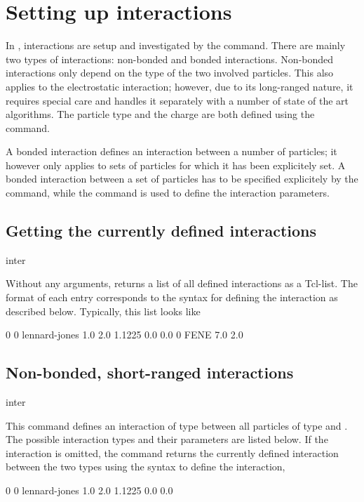 \chapter{Setting up interactions}
\label{sec:inter}

In \es, interactions are setup and investigated by the 
command. There are mainly two types of interactions: non-bonded and
bonded interactions. Non-bonded interactions only depend on the type
of the two involved particles. This also applies to the electrostatic
interaction; however, due to its long-ranged nature, it requires
special care and \es handles it separately with a number of state of
the art algorithms. The particle type and the charge are both defined
using the  command.

A bonded interaction defines an interaction between a number of
particles; it however only applies to sets of particles for which it
has been explicitely set.  A bonded interaction between a set of
particles has to be specified explicitely by the 
command, while the  command is used to define the
interaction parameters.

\section{Getting the currently defined interactions}
\begin{essyntax}
  inter
\end{essyntax}

Without any arguments,  returns a list of all defined
interactions as a Tcl-list. The format of each entry corresponds to
the syntax for defining the interaction as described below. Typically,
this list looks like
\begin{tclcode}
  {0 0 lennard-jones 1.0 2.0 1.1225 0.0 0.0} {0 FENE 7.0 2.0}
\end{tclcode}

\section{Non-bonded, short-ranged interactions}
\label{sec:inter-nb}

\begin{essyntax*}
  inter  
\end{essyntax*}
This command defines an interaction of type  between
all particles of type  and . The possible
interaction types and their parameters are listed below. If the
interaction is omitted, the command returns the currently defined
interaction between the two types using the syntax to define the
interaction, \eg
\begin{tclcode}
  0 0 lennard-jones 1.0 2.0 1.1225 0.0 0.0
\end{tclcode}


